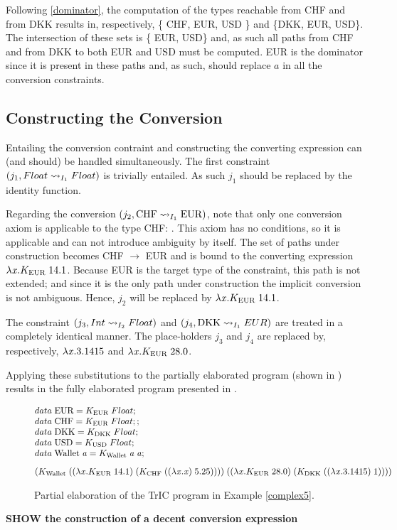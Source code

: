 Following \ref{dominator}, the computation of the types reachable from CHF and from DKK  results in, respectively, \{ CHF, EUR, USD \} and \{DKK, EUR, USD\}. The intersection of these sets is \{ EUR, USD\} and, as such all paths from CHF and from DKK to both EUR and USD must be computed. EUR is the dominator since it is present in these paths and, as such, should replace $a$ in all the conversion constraints.
\subsection{Constructing the Conversion}
Entailing the conversion contraint and constructing the converting expression can (and should) be handled simultaneously. The first constraint $(j_1,\convX{\imEnv_1}{Float}{Float})$ is trivially entailed. As such $j_1$ should be replaced by the identity function.

Regarding the conversion $(j_2,\convX{\imEnv_1}{\text{CHF}}{\text{EUR}})$, note that only one conversion axiom is applicable to the type CHF: . This axiom has no conditions, so it is applicable and can not introduce ambiguity by itself. The set of paths under construction becomes CHF $\to$ EUR and is bound to the converting expression $\lambda \tmVar . K_{\text{EUR}}\; 14.1 $. Because EUR is the target type of the constraint, this path is not extended; and since it is the only path under construction the implicit conversion is not ambiguous. Hence, $j_2$ will be replaced by $\lambda \tmVar . K_{\text{EUR}}\; 14.1 $.

The constraint $(j_3,\convX{\imEnv_2}{Int}{Float})$ and $(j_4,\convX{\imEnv_1}{\text{DKK}}{EUR})$ are treated in a completely identical manner. The place-holders $j_3$ and $j_4$ are replaced by, respectively, $\lambda \tmVar.3.1415$ and $\lambda \tmVar . K_{\text{EUR}}\; 28.0$.

Applying these substitutions to the partially elaborated program (shown in ) results in the fully elaborated program presented in .
\begin{figure}
     \[
\begin{array}{@{\hspace{0mm}}l@{\hspace{0mm}}}
  data\;\text{EUR}=K_{\text{EUR}}\;Float;\\
  data\;\text{CHF}=K_{\text{EUR}}\;Float;;\\
  data\;\text{DKK}=K_{\text{DKK}}\;Float;\\
  data\;\text{USD}=K_{\text{USD}}\;Float;\\
  data\;\text{Wallet}\;\tyVar=K_{\text{Wallet}}\; \tyVar \; \tyVar;\\[3mm]
  (K_{\text{Wallet}}\;((\lambda \tmVar . K_{\text{EUR}}\; 14.1)\;(K_{\text{CHF}}\;((\lambda \tmVar . \tmVar)\; 5.25))))\;((\lambda \tmVar . K_{\text{EUR}}\; 28.0)\; (K_{\text{DKK}}\;((\lambda \tmVar.3.1415)\;1)))) 

\end{array}
\]
\caption{Partial elaboration of the TrIC program in Example \ref{complex5}.}
\label{fullyElab}
\end{figure}

\textbf{SHOW the construction of a decent conversion expression}
